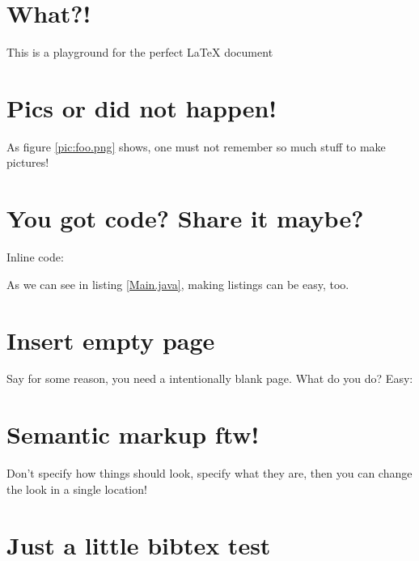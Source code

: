 




\chapter{What?!}

This is a playground for the perfect\texttrademark{} \LaTeX{} document

\chapter{Pics or did not happen!}

As figure \ref{pic:foo.png} shows, one must not remember so much stuff to make pictures!



\chapter{You got code? Share it maybe?}

Inline code: 

As we can see in listing \ref{Main.java}, making listings can be easy, too.


\chapter{Insert empty page}

Say for some reason, you need a intentionally blank page. What do you do? Easy:

\insertEmptyPage

\chapter{Semantic markup ftw!}

Don't specify how things should look, specify what they are, then you can change the look in a single location!



\chapter{Just a little bibtex test}

\blindtext~\cite{SomeRef}





